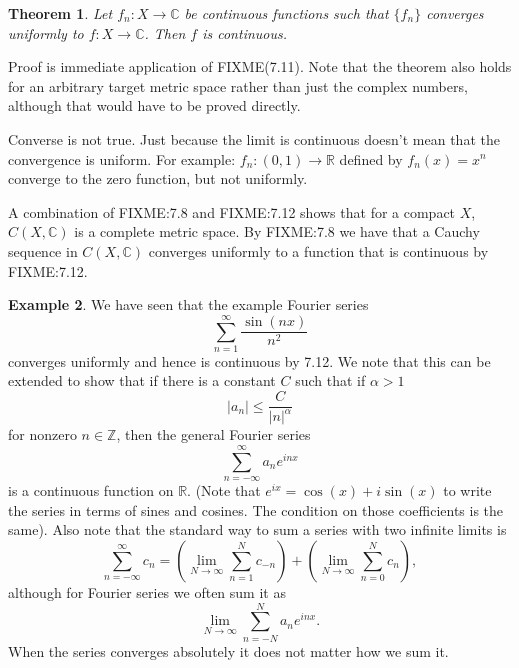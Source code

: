 \documentclass[12pt]{book}
\newcommand{\abs}[1]{\left\lvert {#1} \right\rvert}
\newcommand{\C}{{\mathbb{C}}}
\newcommand{\R}{{\mathbb{R}}}
\newcommand{\Z}{{\mathbb{Z}}}
\theoremstyle{plain}
\newtheorem{thm}{Theorem}[section]
\theoremstyle{remark}
\theoremstyle{definition}
\theoremstyle{exercise}
\theoremstyle{example}
\newtheorem{example}[thm]{Example}
\begin{document}
\begin{thm}
Let $f_n \colon X \to \C$ be continuous functions
such that
$\{ f_n \}$ converges uniformly to $f \colon X \to \C$.  
Then $f$ is continuous.
\end{thm}

Proof is immediate application of FIXME(7.11).  Note that the theorem also holds
for an arbitrary target metric space rather than just the complex numbers,
although that would have to be
proved directly.

Converse is not true.  Just because the limit is continuous doesn't mean
that the convergence is uniform.  For example:
$f_n \colon (0,1) \to \R$ defined by $f_n(x) = x^n$ converge to
the zero function, but not uniformly.

A combination of FIXME:7.8 and FIXME:7.12 shows that for a compact $X$, $C(X,\C)$ is a
complete metric space.  By FIXME:7.8 we have that a Cauchy sequence in $C(X,\C)$
converges uniformly to a function that is continuous by FIXME:7.12.

\begin{example}
We have seen that the example Fourier series 
\begin{equation*}
\sum_{n=1}^\infty \frac{\sin(nx)}{n^2}
\end{equation*}
converges uniformly and hence is continuous by 7.12.  We note that this
can be extended to show that if there is a constant $C$ such that
if $\alpha > 1$
\begin{equation*}
\abs{a_n} \leq \frac{C}{\abs{n}^\alpha}
\end{equation*}
for nonzero $n \in \Z$, then the general Fourier series
\begin{equation*}
\sum_{n=-\infty}^\infty a_n e^{inx}
\end{equation*}
is a continuous function on $\R$.
(Note that $e^{ix} = \cos(x)+i\sin(x)$ to write the series in terms of sines
and cosines.  The condition on those coefficients is the same).
Also note that the standard way to sum a series with two infinite limits
is
\begin{equation*}
\sum_{n=-\infty}^\infty c_n
=
\left(
\lim_{N \to \infty}
\sum_{n=1}^{N} c_{-n}
\right)
+
\left(
\lim_{N \to \infty}
\sum_{n=0}^N c_n
\right) ,
\end{equation*}
although for Fourier series we often sum it as
\begin{equation*}
\lim_{N\to\infty}
\sum_{n=-N}^N a_n e^{inx} .
\end{equation*}
When the series converges absolutely it does not matter how we sum it.
\end{example}
\end{document}
